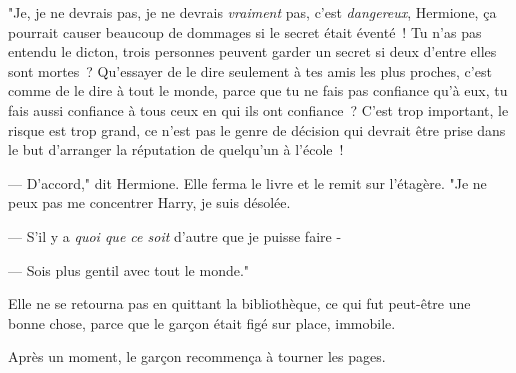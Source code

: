 "Je, je ne devrais pas, je ne devrais \emph{vraiment} pas, c'est \emph{dangereux}, Hermione, ça pourrait causer beaucoup de dommages si le secret était éventé~! Tu n'as pas entendu le dicton, trois personnes peuvent garder un secret si deux d'entre elles sont mortes~? Qu'essayer de le dire seulement à tes amis les plus proches, c'est comme de le dire à tout le monde, parce que tu ne fais pas confiance qu'à eux, tu fais aussi confiance à tous ceux en qui ils ont confiance~? C'est trop important, le risque est trop grand, ce n'est pas le genre de décision qui devrait être prise dans le but d'arranger la réputation de quelqu'un à l'école~!

--- D'accord," dit Hermione. Elle ferma le livre et le remit sur l'étagère. "Je ne peux pas me concentrer Harry, je suis désolée.

--- S'il y a \emph{quoi que ce soit} d'autre que je puisse faire -

--- Sois plus gentil avec tout le monde."

Elle ne se retourna pas en quittant la bibliothèque, ce qui fut peut-être une bonne chose, parce que le garçon était figé sur place, immobile.

Après un moment, le garçon recommença à tourner les pages. 

